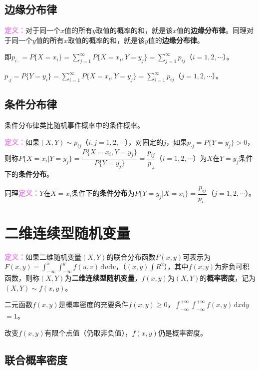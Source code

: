 \subsection{边缘分布律}

\textcolor{violet}{\textbf{定义：}}对于同一个$x$值的所有$y$取值的概率的和，就是该$x$值的\textbf{边缘分布律}。同理对于同一个$y$值的所有$x$取值的概率的和，就是该$y$值的\textbf{边缘分布律}。

即$p_{i\cdot}=P\{X=x_i\}=\sum\limits_{j=1}^\infty P\{X=x_i,Y=y_j\}=\sum\limits_{j=1}^\infty p_{ij}$（$i=1,2,\cdots$）。

$p_{\cdot j}=P\{Y=y_i\}=\sum\limits_{i=1}^\infty P\{X=x_i,Y=y_j\}=\sum\limits_{i=1}^\infty p_{ij}$（$j=1,2,\cdots$）。

\subsection{条件分布律}

条件分布律类比随机事件概率中的条件概率。

\textcolor{violet}{\textbf{定义：}}如果$(X,Y)\sim p_{ij}$（$i,j=1,2,\cdots$），对固定的$j$，如果$p_{\cdot j}=P\{Y=y_j\}>0$，则称$P\{X=x_i|Y=y_j\}=\dfrac{P\{X=x_i,Y=y_j\}}{P\{Y=y_j\}}=\dfrac{p_{ij}}{p_{\cdot j}}$（$i=1,2,\cdots$）为$X$在$Y=y_j$条件下的\textbf{条件分布}。

同理\textcolor{violet}{\textbf{定义：}}$Y$在$X=x_i$条件下的\textbf{条件分布}为$P\{Y=y_j|X=x_i\}=\dfrac{p_{ij}}{p_{i\cdot}}$（$j=1,2,\cdots$）。

\section{二维连续型随机变量}

\textcolor{violet}{\textbf{定义：}}如果二维随机变量$(X,Y)$的联合分布函数$F(x,y)$可表示为$F(x,y)=\int_{-\infty}^x\int_{-\infty}^yf(u,v)\,\textrm{d}u\textrm{d}v$，（$(x,y)\int R^2$），其中$f(x,y)$为非负可积函数，则称$(X,Y)$为\textbf{二维连续型随机变量}，$f(x,y)$为$(X,Y)$的\textbf{概率密度}，记为$(X,Y)\sim f(x,y)$。

二元函数$f(x,y)$是概率密度的充要条件$f(x,y)\geqslant0$，$\int_{-\infty}^{+\infty}\int_{-\infty}^{+\infty}f(x,y)\,\textrm{d}x\textrm{d}y$\\$=1$。

改变$f(x,y)$有限个点值（仍取非负值），$f(x,y)$仍是概率密度。

\subsection{联合概率密度}

